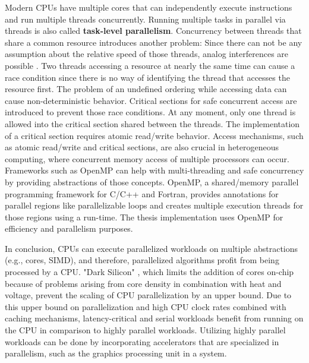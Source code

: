 Modern CPUs have multiple cores that can independently execute instructions and run multiple threads concurrently. Running multiple tasks in parallel via threads is also called \textbf{task-level parallelism}.
Concurrency between threads that share a common resource introduces another problem: Since there can not be any assumption about the relative speed of those threads, analog interferences are possible \cite{netzerWhatAreRace1992}. Two threads accessing a resource at nearly the same time can cause a race condition since there is no way of identifying the thread that accesses the resource first. The problem of an undefined ordering while accessing data can cause non-deterministic behavior. Critical sections for safe concurrent access are introduced to prevent those race conditions. At any moment, only one thread is allowed into the critical section shared between the threads. The implementation of a critical section requires atomic read/write behavior.
Access mechanisms, such as atomic read/write and critical sections, are also crucial in heterogeneous computing, where concurrent memory access of multiple processors can occur.
Frameworks such as OpenMP \cite{dagumOpenMPIndustryStandard1998} can help with multi-threading and safe concurrency by providing abstractions of those concepts. OpenMP, a shared/memory parallel programming framework for C/C++ and Fortran, provides annotations for parallel regions like parallelizable loops and creates multiple execution threads for those regions using a run-time.
The thesis implementation uses OpenMP for efficiency and parallelism purposes.

In conclusion, CPUs can execute parallelized workloads on multiple abstractions (e.g., cores, SIMD), and therefore, parallelized algorithms profit from being processed by a CPU. "Dark Silicon" \cite{esmaeilzadehDarkSiliconEnd2011}, which limits the addition of cores on-chip because of problems arising from core density in combination with heat and voltage, prevent the scaling of CPU parallelization by an upper bound. Due to this upper bound on parallelization and high CPU clock rates combined with caching mechanisms, latency-critical and serial workloads benefit from running on the CPU in comparison to highly parallel workloads. Utilizing highly parallel workloads can be done by incorporating accelerators that are specialized in parallelism, such as the graphics processing unit in a system.

